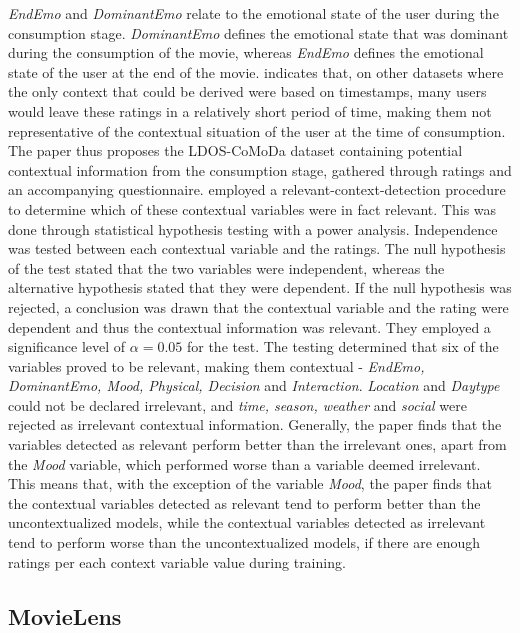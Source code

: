 \textit{EndEmo} and \textit{DominantEmo} relate to the emotional state of the user during the consumption stage.
\textit{DominantEmo} defines the emotional state that was dominant during the consumption of the movie, whereas \textit{EndEmo} defines the emotional state of the user at the end of the movie.
 indicates that, on other datasets where the only context that could be derived were based on timestamps, many users would leave these ratings in a relatively short period of time, making them not representative of the contextual situation of the user at the time of consumption.
The paper thus proposes the LDOS-CoMoDa dataset containing potential contextual information from the consumption stage, gathered through ratings and an accompanying questionnaire.
 employed a relevant-context-detection procedure to determine which of these contextual variables were in fact relevant.
This was done through statistical hypothesis testing with a power analysis.
Independence was tested between each contextual variable and the ratings.
The null hypothesis of the test stated that the two variables were independent, whereas the alternative hypothesis stated that they were dependent.
If the null hypothesis was rejected, a conclusion was drawn that the contextual variable and the rating were dependent and thus the contextual information was relevant.
They employed a significance level of $\alpha = 0.05$ for the test.
The testing determined that six of the variables proved to be relevant, making them contextual - \textit{EndEmo, DominantEmo, Mood, Physical, Decision} and \textit{Interaction}.
\textit{Location} and \textit{Daytype} could not be declared irrelevant, and \textit{time, season, weather} and \textit{social} were rejected as irrelevant contextual information.
Generally, the paper finds that the variables detected as relevant perform better than the irrelevant ones, apart from the \textit{Mood} variable, which performed worse than a variable deemed irrelevant.
This means that, with the exception of the variable \textit{Mood}, the paper finds that the contextual variables detected as relevant tend to perform better than the uncontextualized models, while the contextual variables detected as irrelevant tend to perform worse than the uncontextualized models, if there are enough ratings per each context variable value during training.




\subsection{MovieLens}
